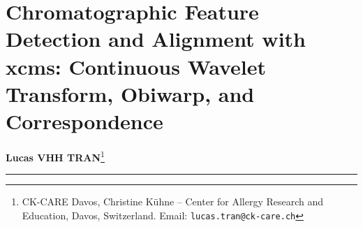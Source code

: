 \documentclass[11pt,twoside,openright]{book}
\begin{document}
\setcounter{chapter}{7} %
\chapter{Chromatographic Feature Detection and Alignment with xcms: Continuous Wavelet Transform, Obiwarp, and Correspondence}
\label{ch:detect_features}

\noindent
\textbf{Lucas VHH TRAN}\footnote{CK-CARE Davos, Christine K\"uhne -- Center for Allergy Research and Education, Davos, Switzerland. Email: \texttt{lucas.tran@ck-care.ch}}\\
\rule{\textwidth}{0.8pt}

\begin{abstract}
\noindent
Untargeted high-resolution liquid chromatography--mass spectrometry (LC-MS) datasets in metabolomics, lipidomics, and bottom-up proteomics do not directly yield molecular abundance tables. The primary output of an instrument acquisition is a continuous, noisy three-dimensional data surface spanned by retention time ($t_R$), mass-to-charge ratio ($m/z$), and detector intensity ($I$). Converting raw instrument files into a reproducible, quantitative feature matrix requires rigorous chromatographic peak detection, retention time alignment across runs, correspondence grouping, and iterative gap-filling.

This chapter establishes the analytical chemistry, signal processing, and mathematical foundations of untargeted LC-MS feature extraction using the modern \texttt{xcms} platform and the Bioconductor \texttt{MSnbase} infrastructure. We formalize the distinction between raw mass spectral peaks and chromatographic features, establish the continuous wavelet transform (CWT) foundations and Mexican hat (Ricker) wavelet mechanics for chromatographic apex localization, and formulate the dynamic region-of-interest (ROI) mass-tracking algorithm. We then examine retention time drift, contrasting non-linear dynamic time warping via Ordered Bijective Interpolated Warping (\texttt{obiwarp}) against peak-density LOESS regression. Furthermore, we formalize correspondence grouping via kernel density estimation and derive the numerical mechanics of gap-filling (\texttt{fillChromPeaks}) to prevent the fabrication of artificial missing values. The chapter includes a complete, reproducible R laboratory on benchmark datasets, an analysis of the ``Five Deadly Sins'' of feature extraction, a tutor's self-assessment diagnostic checklist, and multi-tier exercises with complete worked solutions.
\end{abstract}
\end{document}
